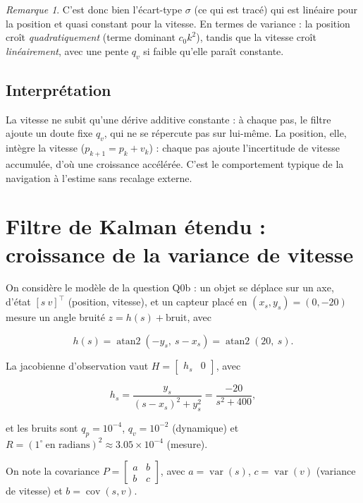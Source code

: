 \documentclass[11pt]{article}
\theoremstyle{remark}
\newtheorem{remark}[theorem]{Remarque}
\theoremstyle{definition}
\begin{document}
\begin{remark}
C'est donc bien l'\'ecart-type $\sigma$ (ce qui est trac\'e) qui est lin\'eaire pour la position et
quasi constant pour la vitesse. En termes de variance : la position cro\^it \emph{quadratiquement}
(terme dominant $c_0 k^2$), tandis que la vitesse cro\^it \emph{lin\'eairement}, avec une pente $q_v$
si faible qu'elle para\^it constante.
\end{remark}

\subsection{Interpr\'etation}

La vitesse ne subit qu'une d\'erive additive constante : \`a chaque pas, le filtre ajoute un doute fixe
$q_v$, qui ne se r\'epercute pas sur lui-m\^eme. La position, elle, int\`egre la vitesse
($p_{k+1} = p_k + v_k$) : chaque pas ajoute l'incertitude de vitesse accumul\'ee, d'o\`u une croissance
acc\'el\'er\'ee. C'est le comportement typique de la navigation \`a l'estime sans recalage externe.

\section{Filtre de Kalman \'etendu : croissance de la variance de vitesse}\label{sec:ekf}

On consid\`ere le mod\`ele de la question Q0b : un objet se d\'eplace sur un axe, d'\'etat
$[s\ v]^\top$ (position, vitesse), et un capteur plac\'e en $(x_s, y_s) = (0, -20)$ mesure un
angle bruit\'e $z = h(s) + \text{bruit}$, avec

\begin{equation}
h(s) = \operatorname{atan2}(-y_s,\ s - x_s) = \operatorname{atan2}(20,\ s).
\label{eq:h-bearing}
\end{equation}

La jacobienne d'observation vaut $H = \begin{bmatrix} h_s & 0 \end{bmatrix}$, avec

\begin{equation}
h_s = \frac{y_s}{(s-x_s)^2 + y_s^2} = \frac{-20}{s^2 + 400},
\label{eq:hs}
\end{equation}

et les bruits sont $q_p = 10^{-4}$, $q_v = 10^{-2}$ (dynamique) et
$R = (1^\circ\ \text{en radians})^2 \approx 3.05\times 10^{-4}$ (mesure).

On note la covariance $P = \begin{bmatrix} a & b \\ b & c \end{bmatrix}$, avec
$a = \operatorname{var}(s)$, $c = \operatorname{var}(v)$ (variance de vitesse) et
$b = \operatorname{cov}(s,v)$.
\end{document}
